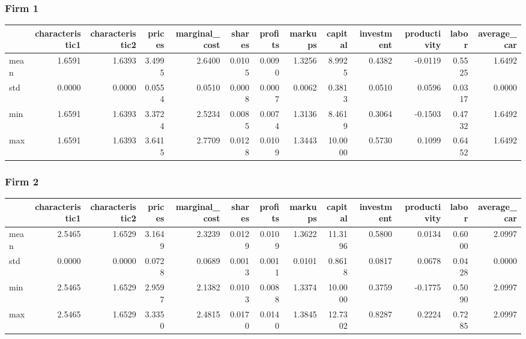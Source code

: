  \subsubsection*{Firm 1}
\begin{tabular}{lrrrrrrrrrrrr}
\toprule
{} &  characteristic1 &  characteristic2 &  prices &  marginal\_cost &  shares &  profits &  markups &  capital &  investment &  productivity &  labor &  average\_car \\
\midrule
mean &           1.6591 &           1.6393 &  3.4995 &         2.6400 &  0.0105 &   0.0090 &   1.3256 &   8.9925 &      0.4382 &       -0.0119 & 0.5525 &       1.6492 \\
std  &           0.0000 &           0.0000 &  0.0554 &         0.0510 &  0.0008 &   0.0007 &   0.0062 &   0.3813 &      0.0510 &        0.0596 & 0.0317 &       0.0000 \\
min  &           1.6591 &           1.6393 &  3.3724 &         2.5234 &  0.0085 &   0.0074 &   1.3136 &   8.4619 &      0.3064 &       -0.1503 & 0.4732 &       1.6492 \\
max  &           1.6591 &           1.6393 &  3.6415 &         2.7709 &  0.0128 &   0.0109 &   1.3443 &  10.0000 &      0.5730 &        0.1099 & 0.6452 &       1.6492 \\
\bottomrule
\end{tabular}


 \subsubsection*{Firm 2}
\begin{tabular}{lrrrrrrrrrrrr}
\toprule
{} &  characteristic1 &  characteristic2 &  prices &  marginal\_cost &  shares &  profits &  markups &  capital &  investment &  productivity &  labor &  average\_car \\
\midrule
mean &           2.5465 &           1.6529 &  3.1649 &         2.3239 &  0.0129 &   0.0109 &   1.3622 &  11.3196 &      0.5800 &        0.0134 & 0.6000 &       2.0997 \\
std  &           0.0000 &           0.0000 &  0.0728 &         0.0689 &  0.0013 &   0.0011 &   0.0101 &   0.8618 &      0.0817 &        0.0678 & 0.0428 &       0.0000 \\
min  &           2.5465 &           1.6529 &  2.9597 &         2.1382 &  0.0103 &   0.0088 &   1.3374 &  10.0000 &      0.3759 &       -0.1775 & 0.5090 &       2.0997 \\
max  &           2.5465 &           1.6529 &  3.3350 &         2.4815 &  0.0170 &   0.0140 &   1.3845 &  12.7302 &      0.8287 &        0.2224 & 0.7285 &       2.0997 \\
\bottomrule
\end{tabular}


